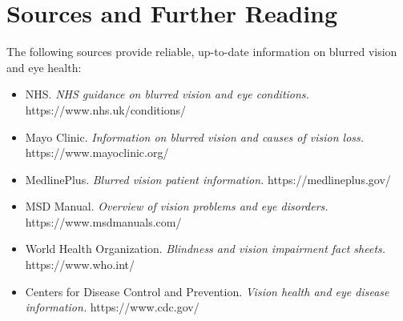 \section*{Sources and Further Reading}
The following sources provide reliable, up-to-date information on blurred vision and eye health:

\begin{itemize}
    \item NHS. \textit{NHS guidance on blurred vision and eye conditions.} https://www.nhs.uk/conditions/
    \item Mayo Clinic. \textit{Information on blurred vision and causes of vision loss.} https://www.mayoclinic.org/
    \item MedlinePlus. \textit{Blurred vision patient information.} https://medlineplus.gov/
    \item MSD Manual. \textit{Overview of vision problems and eye disorders.} https://www.msdmanuals.com/
    \item World Health Organization. \textit{Blindness and vision impairment fact sheets.} https://www.who.int/
    \item Centers for Disease Control and Prevention. \textit{Vision health and eye disease information.} https://www.cdc.gov/
\end{itemize}
